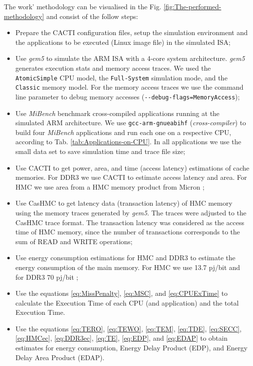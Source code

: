 \documentclass{sig-alternate-05-2015}
\begin{document}
The work' methodology can be visualised in the Fig. \ref{fig:The-performed-methodology} and consist of the follow steps:
\begin{itemize}
\item Prepare the CACTI configuration files, setup the simulation environment and the applications to be executed (Linux image file) in the simulated ISA;
\item Use \emph{gem5} \cite{binkert2011gem5}\cite{gem5:2017} to simulate the ARM ISA \cite{ARM:2017} with a 4-core system architecture. \emph{gem5} generates execution stats and memory access traces. We used the \texttt{AtomicSimple} CPU model, the \texttt{Full-System} simulation mode, and the \texttt{Classic} memory model. For the memory access traces we use the command line parameter to debug memory accesses (\texttt{-{}-debug-flags=MemoryAccess}); 
\item Use \emph{MiBench} benchmark \cite{Guthaus:2001:Mibench} cross-compiled applications running at the simulated ARM architecture. We use \texttt{gcc-arm-gnueabihf} (\emph{cross-compiler}) to build four \emph{MiBench} applications and run each one on a respective CPU, according to Tab. \ref{tab:Applications-on-CPU}. In all applications we use the small data set to save simulation time and trace file size;
\item Use CACTI \cite{WiltonJouppi:CACTI:1996,chen2012cacti3DD,jouppi2015cacti-IO} to get power, area, and time (access latency) estimations of cache memories. For DDR3 we use CACTI to estimate access latency and area. For HMC we use area from a HMC memory product from Micron \cite{Micron:HMC_DataSheet:2010};
\item Use CasHMC \cite{jeon2017cashmc} to get latency data (transaction latency) of HMC memory using the memory traces generated by \emph{gem5}. The traces were adjusted to the CasHMC trace format. The transaction latency was considered as the access time of HMC memory, since the number of transactions corresponds to the sum of READ and WRITE operations;
\item Use energy consumption estimations for HMC and DDR3 \cite{rosenfeld2014performance,pawlowski2011HybridMC,Malladi:2012,jeddeloh2012HMC} to estimate the energy consumption of the main memory. For HMC we use 13.7 pj/bit and for DDR3 70 pj/bit \cite{rosenfeld2014performance}; 
\item Use the equations \ref{eq:MissPenalty}, \ref{eq:MSC}, and \ref{eq:CPUExTime} to calculate the Execution Time of each CPU (and application) and the total Execution Time.
\item Use the equations \ref{eq:TERO}, \ref{eq:TEWO}, \ref{eq:TEM}, \ref{eq:TDE}, \ref{eq:SECC}, \ref{eq:HMCec}, \ref{eq:DDR3ec}, \ref{eq:TE}, \ref{eq:EDP}, and \ref{eq:EDAP} to obtain estimates for energy consumption, Energy Delay Product (EDP), and Energy Delay Area Product (EDAP).
\end{itemize}
\end{document}
